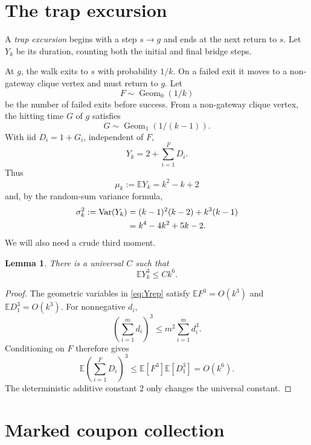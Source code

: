 \documentclass[11pt]{article}
\newtheorem{lemma}[theorem]{Lemma}
\newcommand{\E}{\mathbb E}
\newcommand{\Var}{\operatorname{Var}}
\begin{document}
\section{The trap excursion}

A \emph{trap excursion} begins with a step $s\to g$ and ends at the next
return to $s$.  Let $Y_k$ be its duration, counting both the initial and final
bridge steps.

At $g$, the walk exits to $s$ with probability $1/k$.  On a failed exit it
moves to a non-gateway clique vertex and must return to $g$.  Let
\[
 F\sim\operatorname{Geom}_0(1/k)
\]
be the number of failed exits before success.  From a non-gateway clique
vertex, the hitting time $G$ of $g$ satisfies
\[
 G\sim\operatorname{Geom}_1(1/(k-1)).
\]
With iid $D_i=1+G_i$, independent of $F$,
\begin{equation}\label{eq:Yrep}
 Y_k=2+\sum_{i=1}^{F}D_i.
\end{equation}
Thus
\begin{equation}\label{eq:Ymom}
 \mu_k:=\E Y_k=k^2-k+2
\end{equation}
and, by the random-sum variance formula,
\begin{align}
 \sigma_k^2:=\Var(Y_k)
 &= (k-1)^2(k-2)+k^3(k-1)\notag\\
 &=k^4-4k^2+5k-2.\label{eq:Yvar}
\end{align}
We will also need a crude third moment.

\begin{lemma}\label{lem:Ythird}
There is a universal $C$ such that
\[
 \E Y_k^3\le Ck^6.
\]
\end{lemma}

\begin{proof}
The geometric variables in \eqref{eq:Yrep} satisfy
$\E F^3=O(k^3)$ and $\E D_1^3=O(k^3)$.  For nonnegative $d_i$,
\[
 \left(\sum_{i=1}^m d_i\right)^3
 \le m^2\sum_{i=1}^m d_i^3.
\]
Conditioning on $F$ therefore gives
\[
 \E\left(\sum_{i=1}^F D_i\right)^3
 \le \E[F^3]\E[D_1^3]=O(k^6).
\]
The deterministic additive constant $2$ only changes the universal constant.
\end{proof}

\section{Marked coupon collection}
\end{document}
